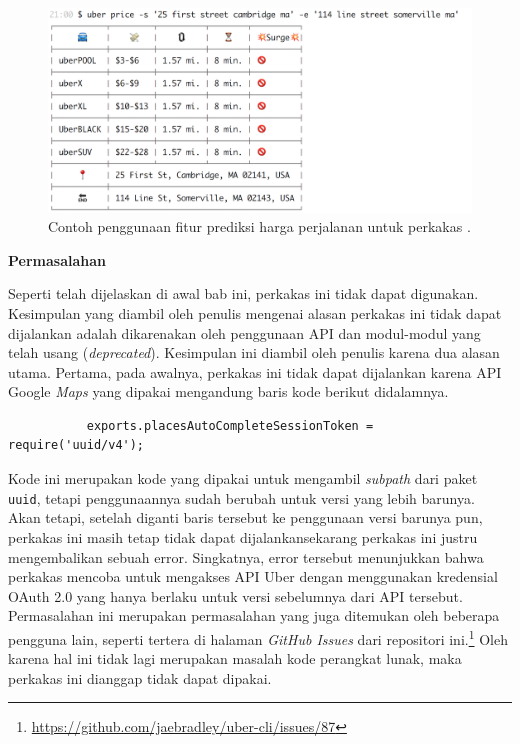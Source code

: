 \documentclass[a4paper,twoside]{article}
\begin{document}
\begin{enumerate}
\begin{figure}[ht]
    \centering
    \includegraphics[width=0.75\linewidth]{ubercli-price}
    \caption[Contoh penggunaan perkakas \ubercli (\textit{price})]{Contoh penggunaan fitur prediksi harga perjalanan untuk perkakas \ubercli.\protect\footnotemark}
    \label{fig:similarapps-ubercli-price}
\end{figure}

\textbf{Permasalahan}
\label{sec:similarapps-ubercli-problem}

Seperti telah dijelaskan di awal bab ini, perkakas ini tidak dapat digunakan. Kesimpulan yang diambil oleh penulis mengenai alasan perkakas ini tidak dapat dijalankan adalah dikarenakan oleh penggunaan API dan modul-modul yang telah usang (\textit{deprecated}). Kesimpulan ini diambil oleh penulis karena dua alasan utama. Pertama, pada awalnya, perkakas ini tidak dapat dijalankan karena API Google \textit{Maps} yang dipakai mengandung baris kode berikut didalamnya.

\begin{verbatim}
           exports.placesAutoCompleteSessionToken = require('uuid/v4');
\end{verbatim}
\vfill\newpage %
Kode ini merupakan kode yang dipakai untuk mengambil \textit{subpath} dari paket \verb|uuid|, tetapi penggunaannya sudah berubah untuk versi yang lebih barunya. Akan tetapi, setelah diganti baris tersebut ke penggunaan versi barunya pun, perkakas ini masih tetap tidak dapat dijalankan\textemdash sekarang perkakas ini justru mengembalikan sebuah error. Singkatnya, error tersebut menunjukkan bahwa perkakas \mbox{mencoba} untuk mengakses API Uber dengan menggunakan kredensial OAuth 2.0 yang hanya berlaku untuk versi sebelumnya dari API tersebut. Permasalahan ini merupakan permasalahan yang juga ditemukan oleh beberapa pengguna lain, seperti tertera di halaman \textit{GitHub Issues} dari repositori ini.\footnote{\href{https://github.com/jaebradley/uber-cli/issues/87}{https://github.com/jaebradley/uber-cli/issues/87}} Oleh karena hal ini tidak lagi merupakan masalah kode perangkat lunak, maka perkakas ini dianggap tidak dapat dipakai.


\end{enumerate}
\end{document}
